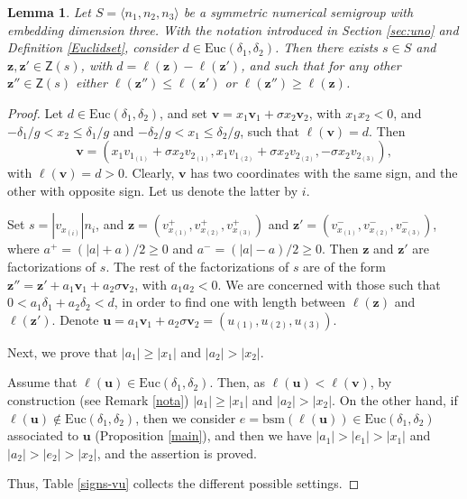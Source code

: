 \documentclass[11pt]{amsart}
\newtheorem{lemma}[theorem]{Lemma}
\theoremstyle{remark}
\begin{document}
\begin{lemma}\label{siesta}
Let $S=\langle n_1,n_2,n_3\rangle$ be a symmetric numerical semigroup with embedding dimension three. With the notation introduced in Section \ref{sec:uno} and Definition \ref{Euclidset}, consider $d\in \mathrm{Euc}(\delta_1,\delta_2)$. Then there exists $s\in S$ and $\mathbf z,\mathbf z'\in\mathsf Z(s)$, with $d=\ell(\mathbf z)-\ell(\mathbf z')$, and such that for any other $\mathbf z''\in\mathsf Z(s)$ either $\ell(\mathbf z'')\le \ell(\mathbf z')$ or $\ell(\mathbf z'')\ge\ell(\mathbf z)$.
\end{lemma}
\begin{proof}
Let $d\in \mathrm{Euc}(\delta_1,\delta_2)$, and set $\mathbf v=x_1\mathbf v_1+\sigma x_2\mathbf v_2$, with $x_1x_2<0$, and $-\delta_1/g<x_2\le \delta_1/g$ and $-\delta_2/g<x_1\le \delta_2/g$, such that $\ell(\mathbf v)=d$. Then
\[
\mathbf v=(x_1v_{1_{(1)}}+\sigma x_2v_{2_{(1)}},x_1v_{1_{(2)}}+\sigma x_2v_{2_{(2)}},-\sigma x_2v_{2_{(3)}}), 
\]
with $\ell(\mathbf v)=d>0$. Clearly, $\mathbf v$ has two coordinates with the same sign, and the other with opposite sign. Let us denote the latter by  $i$. 

Set $s=|v_{x_{(i)}}|n_i$, and $\mathbf z=(v^+_{x_{(1)}},v^+_{x_{(2)}},v^+_{x_{(3)}})$ and $\mathbf z'=(v^-_{x_{(1)}},v^-_{x_{(2)}},v^-_{x_{(3)}})$, where $a^+=(|a|+a)/2\ge 0$ and $a^-=(|a|-a)/2\ge 0$. Then $\mathbf z$ and $\mathbf z'$ are factorizations of $s$. The rest of the factorizations of $s$ are of the form $\mathbf z''=\mathbf z'+a_1\mathbf v_1+a_2\sigma\mathbf v_2$, with $a_1a_2<0$. We are concerned with those such that $0<a_1\delta_1+a_2\delta_2<d$, in order to find one with length between $\ell(\mathbf z)$ and $\ell(\mathbf z')$. Denote $\mathbf u=a_1\mathbf v_1+a_2\sigma\mathbf v_2=(u_{(1)},u_{(2)},u_{(3)})$. 

Next, we prove that $|a_1|\ge |x_1|$ and $|a_2|>|x_2|$.

Assume that $\ell(\mathbf u)\in \mathrm{Euc}(\delta_1,\delta_2)$. Then, as $\ell(\mathbf u)<\ell(\mathbf v)$, by construction (see Remark \ref{nota}) $|a_1|\ge |x_1|$ and $|a_2|>|x_2|$. On the other hand, if $\ell(\mathbf u)\notin \mathrm{Euc}(\delta_1,\delta_2)$, then we consider $e=\mathrm {bsm}(\ell(\mathbf u))\in \mathrm {Euc}(\delta_1,\delta_2)$ associated to $\mathbf u$ (Proposition \ref{main}), and then we have $|a_1|>|e_1|>|x_1|$ and $|a_2|>|e_2|>|x_2|$, and the assertion is proved.
 
Thus, Table  \ref{signs-vu} collects the different possible settings.


\end{proof}
\end{document}
